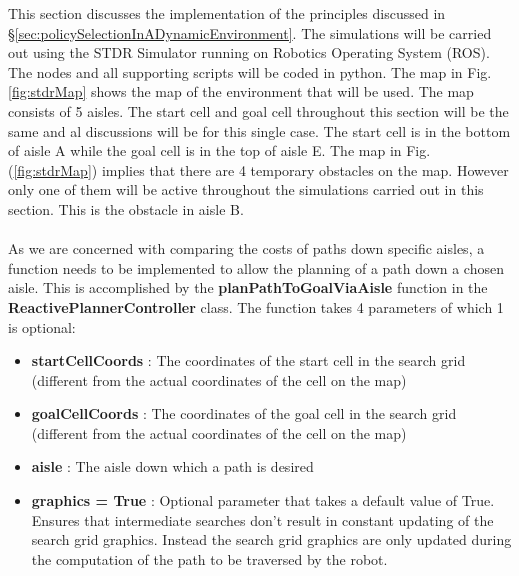 \documentclass[a4paper,12pt]{article}
\begin{document}
			This section discusses the implementation of the principles discussed in \S \ref{sec:policySelectionInADynamicEnvironment}. The simulations will be carried out using the STDR Simulator running on Robotics Operating System (ROS). The nodes and all supporting scripts will be coded in python. The map in Fig. \ref{fig:stdrMap} shows the map of the environment that will be used. The map consists of 5 aisles. The start cell and goal cell throughout this section will be the same and al discussions will be for this single case. The start cell is in the bottom of aisle A while the goal cell is in the top of aisle E. The map in Fig. (\ref{fig:stdrMap}) implies that there are 4 temporary obstacles on the map. However only one of them will be active throughout the simulations carried out in this section. This is the obstacle in aisle B.
			\\
			\\
			As we are concerned with comparing the costs of paths down specific aisles, a function needs to be implemented to allow the planning of a path down a chosen aisle. This is accomplished by the \textbf{planPathToGoalViaAisle} function in the \textbf{ReactivePlannerController} class. The function takes 4 parameters of which 1 is optional:
			\begin{itemize}
				\item \textbf{startCellCoords} : The coordinates of the start cell in the search grid (different from the actual coordinates of the cell on the map)
				\item \textbf{goalCellCoords} : The coordinates of the goal cell in the search grid (different from the actual coordinates of the cell on the map)
				\item \textbf{aisle} : The aisle down which a path is desired
				\item \textbf{graphics = True} : Optional parameter that takes a default value of True. Ensures that intermediate searches don't result in constant updating of the search grid graphics. Instead the search grid graphics are only updated during the computation of the path to be traversed by the robot. 
			\end{itemize} 
			
\end{document}
